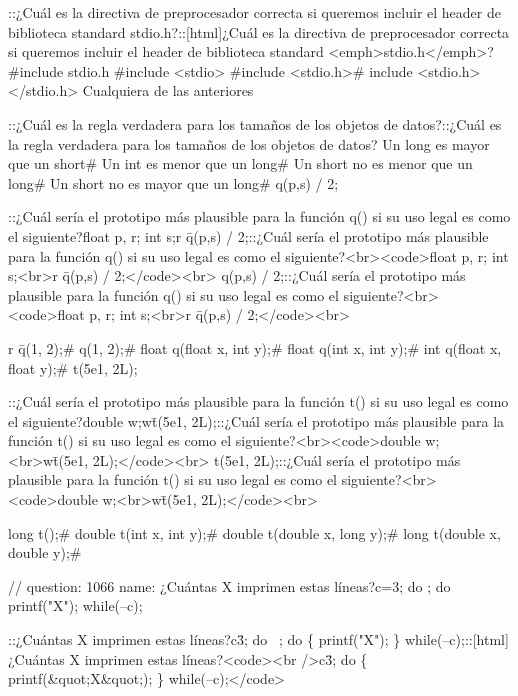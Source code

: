 {{{{{{{{{{{{{{{\question ::¿Cuál es la directiva de preprocesador correcta si queremos incluir el header de biblioteca standard stdio.h?::[html]¿Cuál es la directiva de preprocesador correcta si queremos incluir el header de biblioteca standard <emph>stdio.h</emph>?
\choice \#include stdio.h
\choice \#include <stdio>
\correctchoice \#include <stdio.h># include <stdio.h></stdio.h>
\choice Cualquiera de las anteriores

\question ::¿Cuál es la regla verdadera para los tamaños de los objetos de datos?::¿Cuál es la regla verdadera para los tamaños de los objetos de datos?
\choice Un long es mayor que un short# 
\choice Un int es menor que un long# 
\choice Un short no es menor que un long# 
\correctchoice Un short no es mayor que un long# 
\correctchoice q(p,s) / 2; 

\question ::¿Cuál sería el prototipo más plausible para la función q() si su uso legal es como el siguiente?float p, r; int s;r \= q(p,s) / 2;::¿Cuál sería el prototipo más plausible para la función q() si su uso legal es como el siguiente?<br><code>float p, r; int s;<br>r \= q(p,s) / 2;</code><br>
\correctchoice q(p,s) / 2;::¿Cuál sería el prototipo más plausible para la función q() si su uso legal es como el siguiente?<br><code>float p, r; int s;<br>r \= q(p,s) / 2;</code><br>{
\choice r \= q(1, 2);# 
\correctchoice q(1, 2);# 
\correctchoice float q(float x, int y);# 
\choice float q(int x, int y);# 
\choice int q(float x, float y);# 
\correctchoice t(5e1, 2L); 

\question ::¿Cuál sería el prototipo más plausible para la función t() si su uso legal es como el siguiente?double w;w\=t(5e1, 2L);::¿Cuál sería el prototipo más plausible para la función t() si su uso legal es como el siguiente?<br><code>double w;<br>w\=t(5e1, 2L);</code><br>
\correctchoice t(5e1, 2L);::¿Cuál sería el prototipo más plausible para la función t() si su uso legal es como el siguiente?<br><code>double w;<br>w\=t(5e1, 2L);</code><br>{
\choice long t();# 
\choice double t(int x, int y);# 
\correctchoice double t(double x, long y);# 
\choice long t(double x, double y);# 

\question // question: 1066  name: ¿Cuántas X imprimen estas líneas?c=3; do 
; do { printf("X"); } while(--c); 

\question ::¿Cuántas X imprimen estas líneas?c\=3; do \
; do \{ printf("X"); \} while(--c);::[html]¿Cuántas X imprimen estas líneas?<code><br />c\=3; do \{ printf(&quot;X&quot;); \} while(--c);</code>{
\choice 1

}}}}}}}}}}}}}}}}}}
